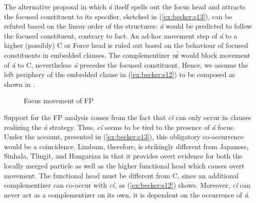 \documentclass[output=paper,
modfonts
]{langscibook}
\begin{document}
The alternative proposal in which {\em \'a} itself spells out the focus head and attracts the focused constituent to its specifier, sketched in (\ref{ex:becker:s13}), can be refuted based on the linear order of the structures: {\em \'a} would be predicted to follow the focused constituent, contrary to fact. An ad-hoc movement step of {\em \'a} to a higher (possibly) C or Force head is ruled out based on the behaviour of focused constituents in embedded clauses.
\ea
{}
\z \z\vspace{\baselineskip}
\noindent The complementizer {\em n\`ɛ} would block movement of {\em \'a} to C, nevertheless {\em \'a} precedes the focused constituent. Hence, we assume the left periphery of the embedded clause in (\ref{ex:becker:s12}) to be composed as shown in .
\begin{figure}
\caption{Focus movement of FP}
\label{fig:syntax:f1}
\end{figure}

Support for the FP analysis comes from the fact that {\em c\'i} can only occur in clauses realizing the {\em \'a} strategy. Thus, {\em c\'i} seems to be tied to the presence of {\em \'a} focus. Under the account, presented in (\ref{ex:becker:s13}), this obligatory co-occurrence would be a coincidence. Limbum, therefore, is strikingly different from Japanese, Sinhala, Tlingit, and Hungarian in that it provides overt evidence for both the locally merged particle as well as the higher functional head which causes overt movement. The functional head must be different from C, since an additional complementizer can co-occur with {\em c\'i}, as (\ref{ex:becker:s12}) shows. Moreover, {\em c\'i} can never act as a complementizer on its own, it is dependent on the occurrence of {\em \'a}.
\end{document}
